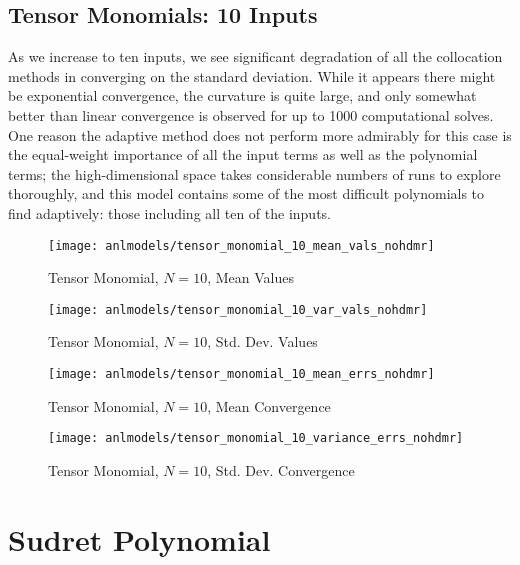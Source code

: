 \subsection{Tensor Monomials: 10 Inputs}
As we increase to ten inputs, we see significant degradation of all the collocation methods in converging on
the standard deviation.  While it appears there might be exponential convergence, the curvature is quite large, and
only somewhat better than linear convergence is observed for up to 1000 computational solves.  One reason the
adaptive method does not perform more admirably for this case is the equal-weight importance of all the input
terms as well as the polynomial terms; the high-dimensional space takes considerable numbers of runs to
explore thoroughly, and this model contains some of the most difficult polynomials to find adaptively: those including
all ten of the inputs. 
\begin{figure}[H]
  \centering
  \texttt{[image: anlmodels/tensor\_monomial\_10\_mean\_vals\_nohdmr]}
  \caption{Tensor Monomial, $N=10$, Mean Values}
  \label{fig:tensormono mean values 10}
\end{figure}
\begin{figure}[H]
  \centering
  \texttt{[image: anlmodels/tensor\_monomial\_10\_var\_vals\_nohdmr]}
  \caption{Tensor Monomial, $N=10$, Std. Dev. Values}
  \label{fig:tensormono var values 10}
\end{figure}

\begin{figure}[H]
  \centering
  \texttt{[image: anlmodels/tensor\_monomial\_10\_mean\_errs\_nohdmr]}
  \caption{Tensor Monomial, $N=10$, Mean Convergence}
  \label{fig:tensormono mean errors 10}
\end{figure}
\begin{figure}[H]
  \centering
  \texttt{[image: anlmodels/tensor\_monomial\_10\_variance\_errs\_nohdmr]}
  \caption{Tensor Monomial, $N=10$, Std. Dev. Convergence}
  \label{fig:tensormono var errors 10}
\end{figure}


\section{Sudret Polynomial}
